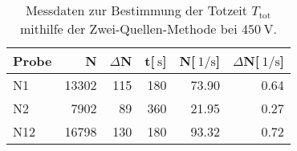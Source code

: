 
\begin{table}[!h]
\begin{center}
\begin{tabular}{|l|r|r|r|r|r|}
\hline
Probe & N & $\Delta$N & t[$\SI{}{\second}$] & N[$\SI{}{1\per\second}$] & $\Delta$N[$\SI{}{1\per\second}$]\\
\hline
\hline
N1 & 13302	& 115 & 180 & 73.90 & 0.64 \\
N2 & 7902	& 89  & 360 & 21.95 & 0.27 \\
N12 & 16798	& 130 & 180 & 93.32 & 0.72 \\
\hline
\end{tabular}
\caption[Aufgabe d]{Messdaten zur Bestimmung der Totzeit $T_\mathrm{tot}$ mithilfe der Zwei-Quellen-Methode bei $\SI{450}{\volt}$.}
\label{tabelled}
\end{center}
\end{table}